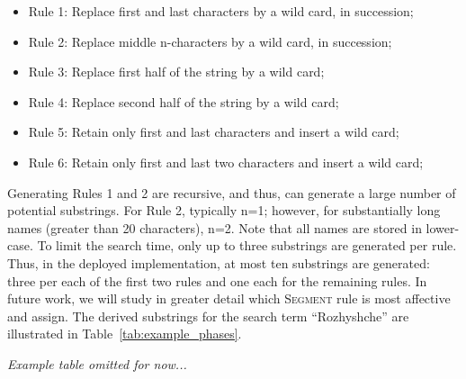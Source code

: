 \documentclass{endm}
\begin{document}
\begin{CJK}{UTF8}{song}
\begin{itemize}
	\item Rule 1:  Replace first and last characters by a wild card, in succession;
	\item Rule 2:  Replace middle n-characters by a wild card, in succession;
	\item Rule 3:  Replace first half of the string by a wild card;
	\item Rule 4:  Replace second half of the string by a wild card;
	\item Rule 5:  Retain only first and last characters and insert a wild card;
	\item Rule 6:  Retain only first and last two characters and insert a wild card;
\end{itemize}

Generating Rules 1 and 2 are recursive, and thus, can generate a large number of potential substrings.  For Rule 2, typically n=1; however, for substantially long names (greater than 20 characters), n=2.   Note that all names are stored in lower-case.  To limit the search time, only up to three substrings are generated per rule.  Thus, in the deployed implementation, at most ten substrings are generated: three per each of the first two rules and one each for the remaining rules.  In future work, we will study in greater detail which S\textsc{egment} rule is most affective and assign.  The derived substrings for the search term ``Rozhyshche'' are illustrated in Table~\ref{tab:example_phases}.


\emph{Example table omitted for now...}




\end{CJK}
\end{document}
